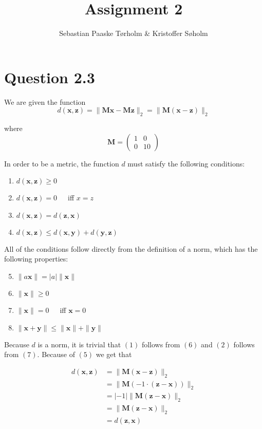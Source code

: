\documentclass[11pt,a4paper]{article}
\title{Assignment 2}
\author{Sebastian Paaske Tørholm \& Kristoffer Søholm}
\begin{document}
\maketitle

\section{Question 2.3}
We are given the function
$$d(\bm{x},\bm{z}) = \| \bm{Mx} - \bm{Mz} \|_{2} = \| \bm{M}(\bm{x} - \bm{z}) \|_{2}$$

where
$$\bm{M} = \begin{pmatrix} 1 & 0 \\ 0 & 10 \end{pmatrix}$$

In order to be a metric, the function $d$ must satisfy the following conditions:

\begin{enumerate}
    \item $d(\bm{x},\bm{z}) \geq 0$
    \item $d(\bm{x},\bm{z}) = 0$\ \ \ iff $x = z$
    \item $d(\bm{x},\bm{z}) = d(\bm{z},\bm{x})$
    \item $d(\bm{x},\bm{z}) \leq d(\bm{x},\bm{y}) + d(\bm{y},\bm{z})$
\end{enumerate}

All of the conditions follow directly from the definition of a norm, which has the
following properties:

\begin{enumerate}
    \setcounter{enumi}{4}
    \item $\| a\bm{x}\| = |a|\| \bm{x} \|$
    \item $\| \bm{x} \| \geq 0$
    \item $\| \bm{x} \| = 0$\ \ \ iff $\bm{x} = 0$
    \item $\| \bm{x} + \bm{y} \| \leq \| \bm{x} \| + \| \bm{y} \|$
\end{enumerate}

Because $d$ is a norm, it is trivial that $(1)$ follows from $(6)$ and $(2)$ follows from $(7)$. Because of $(5)$ we get that 

\begin{align*}
    d(\bm{x}, \bm{z}) &= \| \bm{M}(\bm{x} - \bm{z}) \|_{2} \\
                      &= \| \bm{M}(-1\cdot(\bm{z} - \bm{x})) \|_{2} \\
                      &= |-1|\| \bm{M}(\bm{z} - \bm{x}) \|_{2} \\
                      &= \| \bm{M}(\bm{z} - \bm{x}) \|_{2} \\
                      &= d(\bm{z},\bm{x})
\end{align*}
\end{document}
